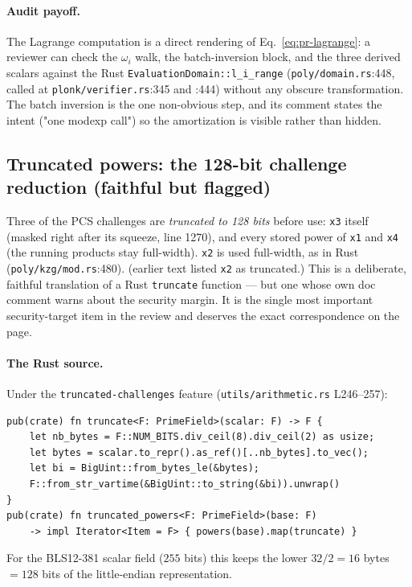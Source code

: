 \paragraph{Audit payoff.} The Lagrange computation is a direct
rendering of Eq.~\eqref{eq:pr-lagrange}: a reviewer can check the
$\omega_i$ walk, the batch-inversion block, and the three derived
scalars against the Rust \texttt{EvaluationDomain::l\_\allowbreak{}i\_\allowbreak{}range}
(\texttt{poly/domain.rs}:448, called at \texttt{plonk/verifier.rs}:345
and :444) without any obscure transformation. The batch inversion is the one
non-obvious step, and its comment states the intent ("one modexp
call") so the amortization is visible rather than hidden.

\subsection{Truncated powers: the 128-bit challenge reduction (faithful but flagged)}
\label{sec:pr-truncate}

Three of the PCS challenges are \emph{truncated to 128 bits} before
use: \texttt{x3} itself (masked right after its squeeze, line 1270), and
every stored power of \texttt{x1} and \texttt{x4} (the running products
stay full-width). \texttt{x2} is used full-width, as in Rust
(\texttt{poly/kzg/mod.rs}:480).  (earlier text listed
\texttt{x2} as truncated.) This is a deliberate, faithful translation of a Rust
\texttt{truncate} function --- but one whose own doc comment warns
about the security margin. It is the single most important
security-target item in the review and deserves the exact
correspondence on the page.

\paragraph{The Rust source.} Under the \texttt{truncated-challenges}
feature (\texttt{utils/\allowbreak{}arithmetic.rs} L246--257):
\begin{lstlisting}[style=rust]
pub(crate) fn truncate<F: PrimeField>(scalar: F) -> F {
    let nb_bytes = F::NUM_BITS.div_ceil(8).div_ceil(2) as usize;
    let bytes = scalar.to_repr().as_ref()[..nb_bytes].to_vec();
    let bi = BigUint::from_bytes_le(&bytes);
    F::from_str_vartime(&BigUint::to_string(&bi)).unwrap()
}
pub(crate) fn truncated_powers<F: PrimeField>(base: F)
    -> impl Iterator<Item = F> { powers(base).map(truncate) }
\end{lstlisting}
For the BLS12-381 scalar field ($255$ bits) this keeps the lower
$32/2 = 16$ bytes $= 128$ bits of the little-endian representation.

